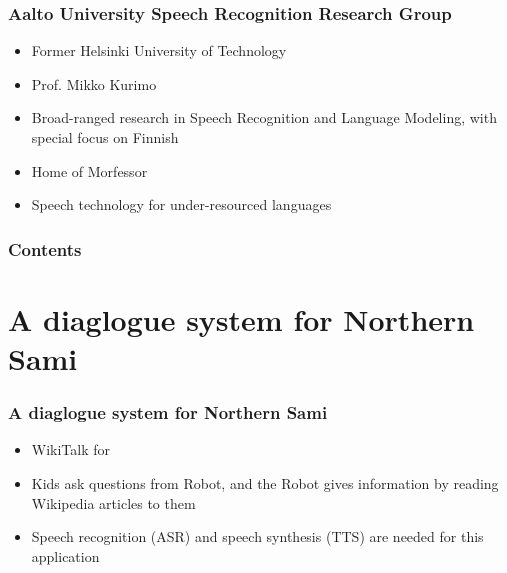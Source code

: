 %
\begin{frame}
\frametitle{Aalto University Speech Recognition Research Group}
\begin{itemize}
\item Former Helsinki University of Technology
\item Prof. Mikko Kurimo
\item Broad-ranged research in Speech Recognition and Language Modeling, with special focus on Finnish
\item Home of Morfessor\\[1cm]
\item Speech technology for under-resourced languages
\end{itemize}
\end{frame}


\begin{frame}
\frametitle{Contents}
\tableofcontents
\end{frame}





\section{A diaglogue system for Northern Sami}
\begin{frame}
\frametitle{A diaglogue system for Northern Sami}
\begin{itemize}
\item WikiTalk for \ns
\item Kids ask questions from Robot, and the Robot gives information by reading Wikipedia articles to them
\item Speech recognition (ASR) and speech synthesis (TTS) are needed for this application
\end{itemize}
\end{frame}

